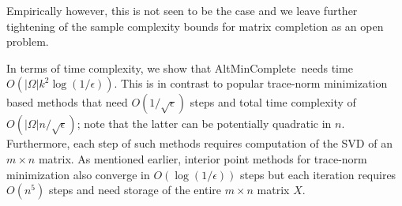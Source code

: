 \documentclass[11pt]{article}
\theoremstyle{plain}
\theoremstyle{definition}
\newcommand{\amc}{AltMinComplete\ }
\begin{document}
Empirically however, this is not seen to be the case \cite{JainMD10} and we leave further tightening of the sample complexity bounds for matrix completion as an open problem. 

In terms of time complexity, we show that \amc needs  time $O(|\Omega| k^2 \log (1/\epsilon))$. This is in contrast to popular trace-norm minimization based methods that need $O(1/\sqrt{\epsilon})$ steps \cite{CaiCS2008} and total time complexity of $O(|\Omega|n/\sqrt{\epsilon})$; note that the latter can be potentially quadratic in  $n$. Furthermore, each step of such methods requires computation of the SVD of an $m\times n$ matrix. As mentioned earlier, interior point methods for trace-norm minimization also converge in $O(\log (1/\epsilon))$ steps but each iteration requires $O(n^5)$ steps and need storage of the entire $m\times n$ matrix $X$. 
\end{document}
